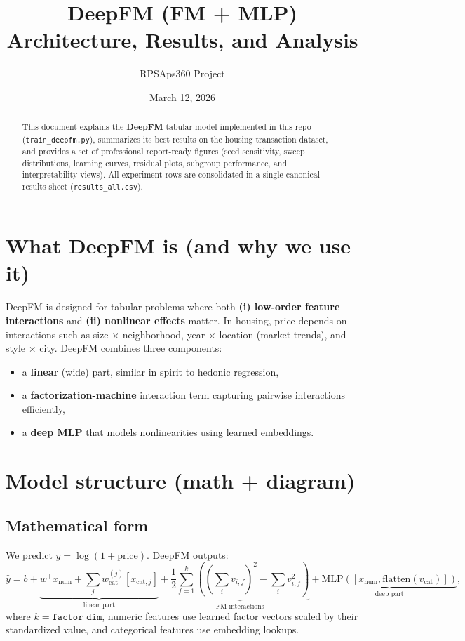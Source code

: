 \documentclass[11pt]{article}
\title{DeepFM (FM + MLP)\\
\large Architecture, Results, and Analysis}
\author{RPSAps360 Project}
\date{March 12, 2026}
\begin{document}
\maketitle

\begin{abstract}
This document explains the \textbf{DeepFM} tabular model implemented in this repo (\texttt{train\_deepfm.py}), summarizes its best results on the housing transaction dataset, and provides a set of professional report-ready figures (seed sensitivity, sweep distributions, learning curves, residual plots, subgroup performance, and interpretability views). All experiment rows are consolidated in a single canonical results sheet (\texttt{results\_all.csv}).
\end{abstract}

\tableofcontents
\newpage

\section{What DeepFM is (and why we use it)}
DeepFM is designed for tabular problems where both \textbf{(i) low-order feature interactions} and \textbf{(ii) nonlinear effects} matter. In housing, price depends on interactions such as size \(\times\) neighborhood, year \(\times\) location (market trends), and style \(\times\) city. DeepFM combines three components:
\begin{itemize}[leftmargin=*]
  \item a \textbf{linear} (wide) part, similar in spirit to hedonic regression,
  \item a \textbf{factorization-machine} interaction term capturing pairwise interactions efficiently,
  \item a \textbf{deep MLP} that models nonlinearities using learned embeddings.
\end{itemize}

\section{Model structure (math + diagram)}
\subsection{Mathematical form}
We predict \(y=\log(1+\text{price})\). DeepFM outputs:
\[
  \hat{y} =
  b
  + \underbrace{w^\top x_{\text{num}} + \sum_j w^{(j)}_{\text{cat}}[x_{\text{cat},j}]}_{\text{linear part}}
  + \underbrace{\frac{1}{2}\sum_{f=1}^k\left(\left(\sum_i v_{i,f}\right)^2 - \sum_i v_{i,f}^2\right)}_{\text{FM interactions}}
  + \underbrace{\text{MLP}([x_{\text{num}}, \text{flatten}(v_{\text{cat}})])}_{\text{deep part}},
\]
where \(k=\texttt{factor\_dim}\), numeric features use learned factor vectors scaled by their standardized value, and categorical features use embedding lookups.
\end{document}
